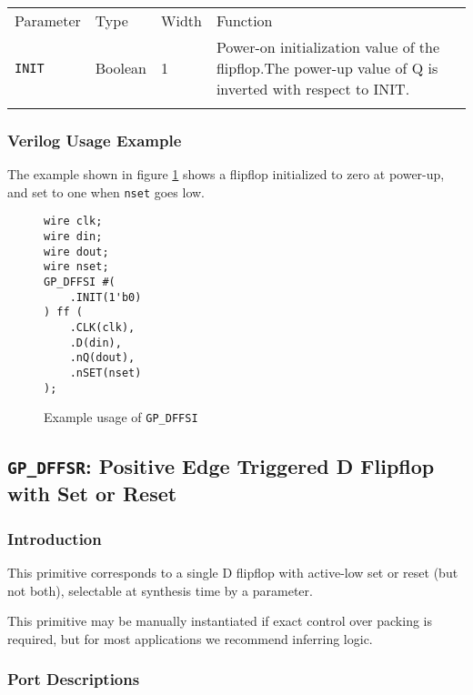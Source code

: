 \documentclass[11pt]{article}
\newcommand{\tokenstyle}[1]{\texttt{#1}}
\newcommand{\wirestyle}[1]{\texttt{#1}}
\newcommand{\whenstyle}[1]{{\fontseries{sb}\selectfont#1}}
\newcommand{\thinhline}{\Xhline{1\arrayrulewidth}}
\newcommand{\thickhline}{\Xhline{2.5\arrayrulewidth}}
\begin{document}
\begin{tabularx}{\textwidth}{lllX}
\thinhline
\whenstyle{Parameter} & \whenstyle{Type} & \whenstyle{Width} & \whenstyle{Function} \\
\thickhline
\tokenstyle{INIT} & Boolean & 1 & Power-on initialization value of the flipflop.\newline The power-up value of Q is
inverted with respect to INIT.\\
\thinhline
\end{tabularx}

\subsubsection{Verilog Usage Example}

The example shown in figure \ref{gp-dffsi-example} shows a flipflop initialized to zero at power-up, and set to one
when \wirestyle{nset} goes low.

\begin{figure}[h]
\begin{lstlisting}
wire clk;
wire din;
wire dout;
wire nset;
GP_DFFSI #(
	.INIT(1'b0)
) ff (
	.CLK(clk),
	.D(din),
	.nQ(dout),
	.nSET(nset)
);
\end{lstlisting}
\caption{Example usage of \tokenstyle{GP\_DFFSI}}
\label{gp-dffsi-example}
\end{figure}


\pagebreak
\subsection{\tokenstyle{GP\_DFFSR}: Positive Edge Triggered D Flipflop with Set or Reset}
\label{gp-dffsr}

\subsubsection{Introduction}
This primitive corresponds to a single D flipflop with active-low set or reset (but not both), selectable at synthesis
time by a parameter.

This primitive may be manually instantiated if exact control over packing is required, but for most applications we
recommend inferring logic.

\subsubsection{Port Descriptions}
\end{document}
